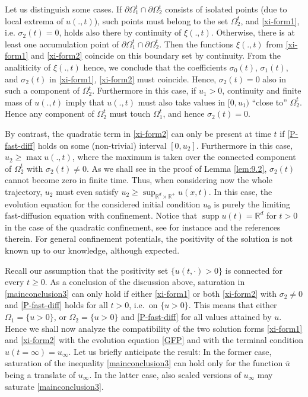 \documentclass[reqno]{amsart}
\newcommand{\R}{\mathbb{R}}
\DeclareMathOperator{\supp}{supp}
\begin{document}
Let us distinguish some cases. If $\partial\Omega_1^t\cap\partial\Omega_2^t$ consists of isolated points (due to local extrema of $u(.,t)$), such points must belong to the set $\Omega_2^t$, and \eqref{xi-form1}, i.e. $\sigma_2(t)=0$, holds also there by continuity of $\xi(.,t)$. 
Otherwise, there is at least one accumulation point of $\partial\Omega_1^t\cap\partial\Omega_2^t$. Then the functions $\xi(.,t)$ from \eqref{xi-form1} and \eqref{xi-form2} coincide on this boundary set by continuity. From the analiticity of $\xi(.,t)$ hence, we conclude that the coefficients $\sigma_0(t)$, $\sigma_1(t)$, and $\sigma_2(t)$ in \eqref{xi-form1}, \eqref{xi-form2} must coincide. 
Hence, $\sigma_2(t)=0$ also in such a component of $\Omega_2^t$. Furthermore in this case, if $u_1>0$, continuity and finite mass of $u(.,t)$ imply that $u(.,t)$ must also take values in $[0,u_1)$ ``close to'' $\Omega_2^t$. Hence any component of $\Omega_2^t$ must touch $\Omega_1^t$, and hence $\sigma_2(t)=0$. 

By contrast, the quadratic term in \eqref{xi-form2} can only be present at time $t$ if \eqref{P-fast-diff} holds on some (non-trivial) interval $[0,u_2]$. Furthermore in this case, $u_2\ge \max u(.,t)$,  where the maximum is taken over the connected component of $\Omega_2^t$ with $\sigma_2(t)\ne0$. 
As we shall see in the proof of Lemma \ref{lem:9.2}, $\sigma_2(t)$ cannot become zero in finite time. Thus, when considering now the whole trajectory, $u_2$ must even satisfy $u_2\ge \sup_{\R^d\times\R^+} u(x,t)$. In this case, the evolution equation for the considered initial condition $u_0$ is purely the limiting fast-diffusion equation with confinement. Notice that $\supp u(t)=\R^d$ for $t>0$ in the case of the quadratic confinement, see for instance \cite{BV06} and the references therein. For general confinement potentials, the positivity of the solution is not known up to our knowledge, although expected.

Recall our assumption that the positivity set $\{u(t,\cdot)>0\}$ is connected for every $t\geq 0$. As a conclusion of the discussion above, saturation in \eqref{mainconclusion3} can only hold if either \eqref{xi-form1} or both \eqref{xi-form2} with $\sigma_2\ne0$ and \eqref{P-fast-diff} holds for all $t>0$, i.e.\ on $\{u>0\}$. This means that either $\Omega_1=\{u>0\}$, or $\Omega_2=\{u>0\}$ and \eqref{P-fast-diff} for all values attained by $u$.
Hence we shall now analyze the compatibility of the two solution forms \eqref{xi-form1} and \eqref{xi-form2} with the evolution equation \eqref{GFP} and with the terminal condition $u(t=\infty)=u_\infty$. Let us briefly anticipate the result: In the former case, saturation of the inequality \eqref{mainconclusion3} can hold only for the function $\bar u$ being a translate of $u_\infty$. In the latter case, also scaled versions of $u_\infty$ may saturate \eqref{mainconclusion3}.
\end{document}
